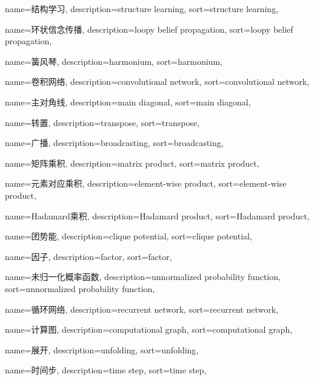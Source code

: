 {
  name=结构学习,
  description={structure learning},
  sort={structure learning},
}

{
  name=环状信念传播,
  description={loopy belief propagation},
  sort={loopy belief propagation},
}

{
  name=簧风琴,
  description={harmonium},
  sort={harmonium},
}

{
  name=卷积网络,
  description={convolutional network},
  sort={convolutional network},
}

{
  name=主对角线,
  description={main diagonal},
  sort={main diagonal},
}

{
  name=转置,
  description={transpose},
  sort={transpose},
}

{
  name=广播,
  description={broadcasting},
  sort={broadcasting},
}

{
  name=矩阵乘积,
  description={matrix product},
  sort={matrix product},
}

{
  name=元素对应乘积,
  description={element-wise product},
  sort={element-wise product},
}

{
  name=Hadamard乘积,
  description={Hadamard product},
  sort={Hadamard product},
}

{
  name=团势能,
  description={clique potential},
  sort={clique potential},
}

{
  name=因子,
  description={factor},
  sort={factor},
}

{
  name=未归一化概率函数,
  description={unnormalized probability function},
  sort={unnormalized probability function},
}

{
  name=循环网络,
  description={recurrent network},
  sort={recurrent network},
}

{
  name=计算图,
  description={computational graph},
  sort={computational graph},
}

{
  name=展开,
  description={unfolding},
  sort={unfolding},
}

{
  name=时间步,
  description={time step},
  sort={time step},
}


